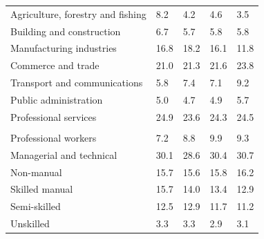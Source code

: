 \documentclass{article}
\begin{document}
\begin{table}[h]
\begin{tabular}{KTTTT}
    \hline
Agriculture, forestry and fishing  & 8.2& 4.2& 4.6& 3.5\\
Building and construction & 6.7& 5.7& 5.8& 5.8\\
Manufacturing industries & 16.8& 18.2& 16.1& 11.8\\
Commerce and trade  & 21.0& 21.3& 21.6& 23.8\\
Transport and communications  & 5.8& 7.4& 7.1& 9.2\\
Public administration & 5.0& 4.7& 4.9& 5.7\\
Professional services & 24.9& 23.6& 24.3& 24.5\\
\hline
    \\ 
    \hline
Professional workers  & 7.2& 8.8 & 9.9& 9.3\\
Managerial and technical & 30.1& 28.6& 30.4& 30.7\\
Non-manual & 15.7& 15.6& 15.8& 16.2\\
Skilled manual & 15.7& 14.0& 13.4& 12.9\\
Semi-skilled & 12.5& 12.9& 11.7& 11.2\\
Unskilled  & 3.3& 3.3& 2.9& 3.1\\
\end{tabular}
\end{table}
\pagebreak
\end{document}
